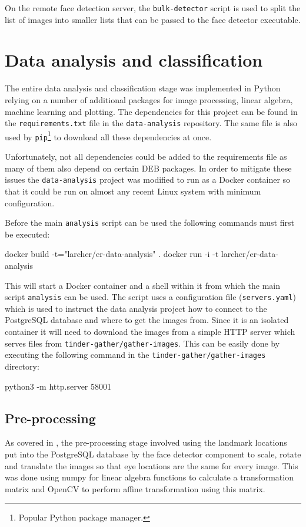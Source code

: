 On the remote face detection server, the \texttt{bulk-detector} script is used
to split the list of images into smaller lists that can be passed to the face
detector executable.

\section{Data analysis and classification}
The entire data analysis and classification stage was implemented in Python
relying on a number of additional packages for image processing, linear
algebra, machine learning and plotting. The dependencies for this project can
be found in the \texttt{requirements.txt} file in the \texttt{data-analysis}
repository. The same file is also used by \texttt{pip}\footnote{Popular Python
package manager.} to download all these dependencies at once.

Unfortunately, not all dependencies could be added to the requirements file as
many of them also depend on certain DEB packages. In order to mitigate these
issues the \texttt{data-analysis} project was modified to run as a Docker
\citep{docker} container so that it could be run on almost any recent Linux
system with minimum configuration.

Before the main \texttt{analysis} script can be used the following commands
must first be executed:
\begin{logs}
    docker build -t="larcher/er-data-analysis" . 
    docker run -i -t larcher/er-data-analysis
\end{logs}
This will start a Docker container and a shell within it from which the main
script \texttt{analysis} can be used. The script uses a configuration file
(\texttt{servers.yaml}) which is used to instruct the data analysis project how
to connect to the PostgreSQL database and where to get the images from. Since
it is an isolated container it will need to download the images from a simple
HTTP server which serves files from \texttt{tinder-gather/gather-images}. This
can be easily done by executing the following command in the
\texttt{tinder-gather/gather-images} directory:
\begin{logs}
    python3 -m http.server 58001
\end{logs}

\subsection{Pre-processing}
As covered in , the pre-processing stage involved
using the landmark locations put into the PostgreSQL database by the face
detector component to scale, rotate and translate the images so that eye
locations are the same for every image. This was done using numpy for linear
algebra functions to calculate a transformation matrix and OpenCV to perform
affine transformation using this matrix.

